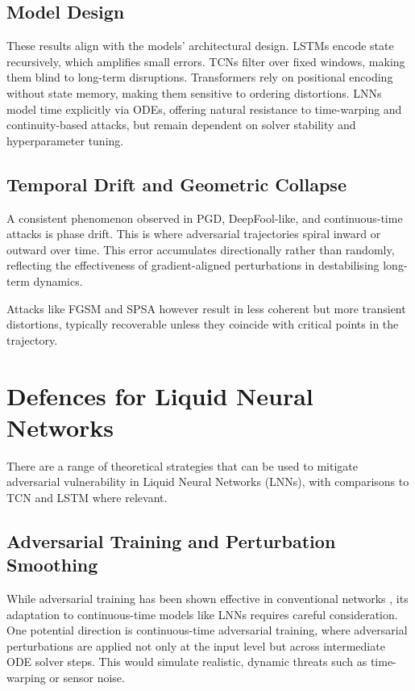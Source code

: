 \subsection*{Model Design}

These results align with the models' architectural design. LSTMs encode state recursively, which amplifies small errors. TCNs filter over fixed windows, making them blind to long-term disruptions. Transformers rely on positional encoding without state memory, making them sensitive to ordering distortions. LNNs model time explicitly via ODEs, offering natural resistance to time-warping and continuity-based attacks, but remain dependent on solver stability and hyperparameter tuning.

\subsection*{Temporal Drift and Geometric Collapse}

A consistent phenomenon observed in PGD, DeepFool-like, and continuous-time attacks is phase drift. This is where adversarial trajectories spiral inward or outward over time. This error accumulates directionally rather than randomly, reflecting the effectiveness of gradient-aligned perturbations in destabilising long-term dynamics.

Attacks like FGSM and SPSA however result in less coherent but more transient distortions, typically recoverable unless they coincide with critical points in the trajectory.

\section{Defences for Liquid Neural Networks}

There are a range of theoretical strategies that can be used to mitigate adversarial vulnerability in Liquid Neural Networks (LNNs), with comparisons to TCN and LSTM where relevant.

\subsection*{Adversarial Training and Perturbation Smoothing}

While adversarial training has been shown effective in conventional networks \cite{madry2018towards}, its adaptation to continuous-time models like LNNs requires careful consideration. One potential direction is continuous-time adversarial training, where adversarial perturbations are applied not only at the input level but across intermediate ODE solver steps. This would simulate realistic, dynamic threats such as time-warping or sensor noise.

